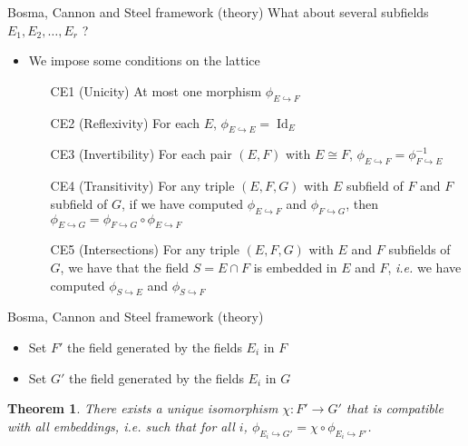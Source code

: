 \documentclass[xcolor=x11names,compress]{beamer}
\theoremstyle{break}
\newtheorem{thm}{Theorem}[section]
\theoremstyle{sc}
\theoremstyle{definition}
\theoremstyle{remark}
\DeclareMathOperator{\Id}{Id}
\newcommand{\ie}{\emph{i.e. }}
\newcommand{\embed}[2]{\phi_{#1\hookrightarrow#2}}
\begin{document}
\begin{frame}{Bosma, Cannon and Steel framework (theory)}
  What about several subfields $E_1, E_2, \dots, E_r$ ?
  \begin{itemize}
    \item We impose some conditions on the lattice 
      \begin{itemize}
        \item[CE1] (Unicity) At most one morphism $\embed{E}{F}$
        \item[CE2] (Reflexivity) For each $E$, $\embed{E}{E}=\Id_E$
        \item[CE3] (Invertibility) For each pair $(E, F)$ with $E\cong F$,
          $\embed{E}{F}=\embed{F}{E}^{-1}$ 
        \item[CE4] (Transitivity) For any triple $(E, F, G)$ with $E$
          subfield of $F$ and $F$ subfield of $G$, if we have
         computed $\embed{E}{F}$ and $\embed{F}{G}$, then
         $\embed{E}{G}=\embed{F}{G}\circ\embed{E}{F}$
       \item[CE5] (Intersections) For any triple $(E, F, G)$ with $E$ and $F$
         subfields of $G$, we have that the field $S=E\cap F$ is embedded in
         $E$ and $F$, \ie we have computed $\embed{S}{E}$ and
         $\embed{S}{F}$
      \end{itemize}
  \end{itemize}
\end{frame}
\begin{frame}{Bosma, Cannon and Steel framework (theory)}
    \begin{figure}
    \centering
  \end{figure}
  \begin{itemize}
    \item Set $F'$ the field generated by the fields $E_i$ in $F$
    \item Set $G'$ the field generated by the fields $E_i$ in $G$
  \end{itemize}
  \begin{thm}
There exists a unique isomorphism $\chi:F'\to G'$ that is compatible with all
embeddings, \ie such that for all $i$,
$\embed{E_i}{G'}=\chi\circ\embed{E_i}{F'}$.
  \end{thm}
\end{frame}
\end{document}
